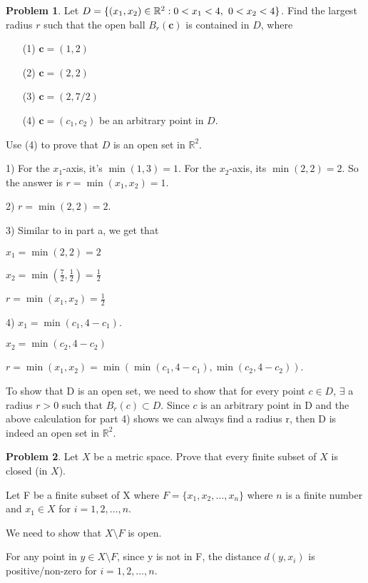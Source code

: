 \documentclass[12]{amsart}
\theoremstyle{definition}
\newtheorem{xca}{Problem}
\newcommand{\R}{\mathbb{R}}
\newcommand{\lskip}{\newpage}
\begin{document}
\lskip

\begin{xca}
Let $D=\{(x_1,x_2)\in \R^2: 0<x_1 < 4, \hskip .05in 0 < x_2 < 4\}$.  Find the largest radius $r$ such that the open ball $B_r(\bm{c})$ is contained in $D$, where
\begin{itemize}
  \item [(1)] $\bm{c}=(1,2)$
  \item [(2)] $\bm{c}=(2,2)$
  \item [(3)] $\bm{c}=(2,7/2)$
  \item [(4)] $\bm{c}=(c_1, c_2)$ be an arbitrary point in $D$.
 \end{itemize}
Use (4) to prove that $D$ is an open set in $\R^2$.

\end{xca}

1) For the $x_1$-axis, it's $\min(1, 3) = 1$.
For the $x_2$-axis, its $\min(2, 2) = 2$.
So the answer is $r = \min(x_1, x_2) = 1$.

2) $r = \min(2, 2) = 2$.

3) Similar to in part a, we get that

$x_1 = \min(2, 2) = 2$

$x_2 = \min(\frac{7}{2}, \frac{1}{2}) = \frac{1}{2}$

$r = \min(x_1, x_2) = \frac{1}{2}$

4) $x_1 = \min(c_1, 4 - c_1)$.

$x_2 = \min(c_2, 4 - c_2)$

$r = \min(x_1, x_2) = \min(\min(c_1, 4 - c_1), \min(c_2, 4 - c_2))$.


To show that D is an open set, we need to show that for every point $c \in D$,
$\exists$ a radius $r > 0$ such that $B_r(c) \subset D$. Since $c$ is an arbitrary
point in D and the above calculation for part 4) shows we can always find a radius r,
then D is indeed an open set in $\R^2$.

\lskip

\begin{xca}
Let $X$ be a metric space.
Prove that every finite subset of $X$ is closed (in $X$).
\end{xca}

Let F be a finite subset of X where $F = \{x_1, x_2, \dots, x_n\}$
where $n$ is a finite number and $x_1 \in X$ for $i = 1, 2, \dots, n$.

We need to show that $X \setminus F$ is open.

For any point in $y \in X \setminus F$, since y is not in F, the distance $d(y, x_i)$
is positive/non-zero for $i = 1, 2, \dots, n$.
\end{document}

